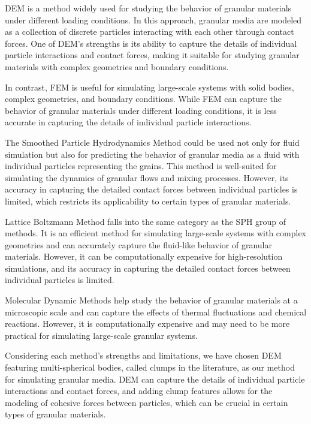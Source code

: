 DEM is a method widely used for studying the behavior of granular materials under different loading conditions. In this approach, granular media are modeled as a collection of discrete particles interacting with each other through contact forces. One of DEM's strengths is its ability to capture the details of individual particle interactions and contact forces, making it suitable for studying granular materials with complex geometries and boundary conditions.

In contrast, FEM is useful for simulating large-scale systems with solid bodies, complex geometries, and boundary conditions. While FEM can capture the behavior of granular materials under different loading conditions, it is less accurate in capturing the details of individual particle interactions.

The Smoothed Particle Hydrodynamics Method could be used not only for fluid simulation but also for predicting the behavior of granular media as a fluid with individual particles representing the grains. This method is well-suited for simulating the dynamics of granular flows and mixing processes. However, its accuracy in capturing the detailed contact forces between individual particles is limited, which restricts its applicability to certain types of granular materials.

Lattice Boltzmann Method falls into the same category as the SPH group of methods. It is an efficient method for simulating large-scale systems with complex geometries and can accurately capture the fluid-like behavior of granular materials. However, it can be computationally expensive for high-resolution simulations, and its accuracy in capturing the detailed contact forces between individual particles is limited.

Molecular Dynamic Methods help study the behavior of granular materials at a microscopic scale and can capture the effects of thermal fluctuations and chemical reactions. However, it is computationally expensive and may need to be more practical for simulating large-scale granular systems.

Considering each method's strengths and limitations, we have chosen DEM featuring multi-spherical bodies, called clumps in the literature, as our method for simulating granular media. DEM can capture the details of individual particle interactions and contact forces, and adding clump features allows for the modeling of cohesive forces between particles, which can be crucial in certain types of granular materials. 

